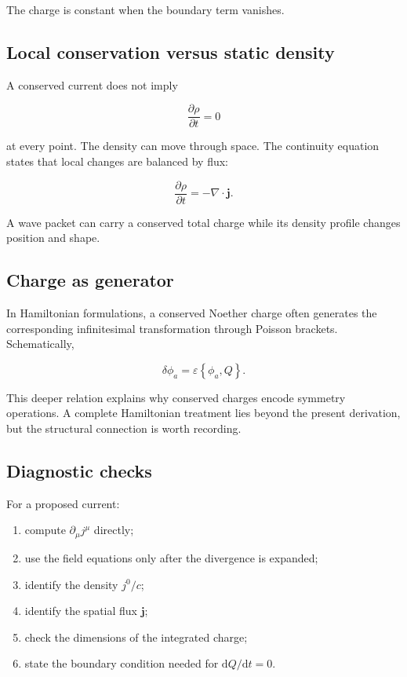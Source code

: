 The charge is constant when the boundary term vanishes.

\subsection{Local conservation versus static density}

A conserved current does not imply

\[
\frac{\partial\rho}{\partial t}=0
\]

at every point. The density can move through space. The continuity equation states that local changes are balanced by flux:

\[
\frac{\partial\rho}{\partial t}
=
-\nabla\cdot\mathbf{j}.
\]

A wave packet can carry a conserved total charge while its density profile changes position and shape.

\subsection{Charge as generator}

In Hamiltonian formulations, a conserved Noether charge often generates the corresponding infinitesimal transformation through Poisson brackets. Schematically,

\[
\delta\phi_a
=
\varepsilon
\left\{
\phi_a,Q
\right\}.
\]

This deeper relation explains why conserved charges encode symmetry operations. A complete Hamiltonian treatment lies beyond the present derivation, but the structural connection is worth recording.

\subsection{Diagnostic checks}

For a proposed current:

\begin{enumerate}
    \item compute \(\partial_{\mu}j^{\mu}\) directly;
    \item use the field equations only after the divergence is expanded;
    \item identify the density \(j^{0}/c\);
    \item identify the spatial flux \(\mathbf{j}\);
    \item check the dimensions of the integrated charge;
    \item state the boundary condition needed for \(\mathrm{d}Q/\mathrm{d}t=0\).
\end{enumerate}

